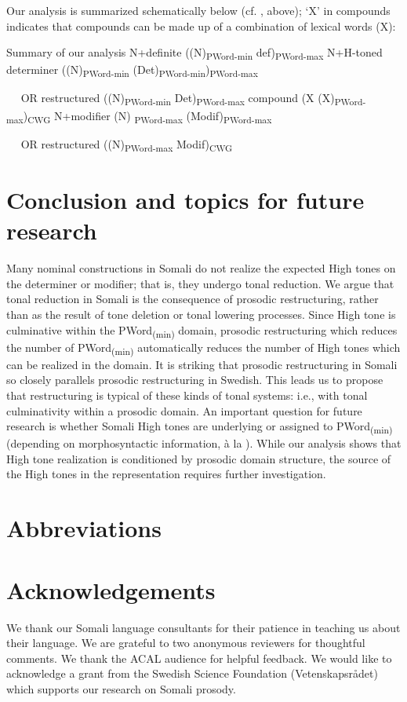 \documentclass[output=paper]{langscibook}
\begin{document}
Our analysis is summarized schematically below (cf. , above); ‘X’ in compounds indicates that compounds can be made up of a combination of lexical words (X):


\ea Summary of our analysis  \label{ex:downing:26}
\ea N+definite        ((N)\textsubscript{PWord-min} def)\textsubscript{PWord-max}
\ex N+H-toned determiner  ((N)\textsubscript{PWord-min} (Det)\textsubscript{PWord-min})\textsubscript{PWord-max} 

  ~~ OR restructured    ((N)\textsubscript{PWord-min} Det)\textsubscript{PWord-max}
\ex compound        (X (X)\textsubscript{PWord-max})\textsubscript{CWG}
\ex N+modifier        (N)\textsubscript{ PWord-max} (Modif)\textsubscript{PWord-max} 

  ~~ OR restructured    ((N)\textsubscript{PWord-max} Modif)\textsubscript{CWG}
\z
\z


\section{Conclusion and topics for future research}

\label{sec:downing:5}
Many nominal constructions in Somali do not realize the expected High tones on the determiner or modifier; that is, they undergo tonal reduction. We argue that tonal reduction in Somali is the consequence of prosodic restructuring, rather than as the result of tone deletion or tonal lowering processes. Since High tone is culminative within the PWord\textsubscript{(min)} domain, prosodic restructuring which reduces the number of PWord\textsubscript{(min)} automatically reduces the number of High tones which can be realized in the domain. It is striking that prosodic restructuring in Somali so closely parallels prosodic restructuring in Swedish. This leads us to propose that restructuring is typical of these kinds of tonal systems: i.e., with tonal culminativity within a prosodic domain. An important question for future research is whether Somali High tones are underlying or assigned to PWord\textsubscript{(min)} (depending on morphosyntactic information, à la \citealt{Hyman1981}). While our analysis shows that High tone realization is conditioned by prosodic domain structure, the source of the High tones in the representation requires further investigation. 

\section*{Abbreviations}

\section*{Acknowledgements}
We thank our Somali language consultants for their patience in teaching us about their language. We are grateful to two anonymous reviewers for thoughtful comments. We thank the ACAL audience for helpful feedback. We would like to acknowledge a grant from the Swedish Science Foundation (Vetenskapsrådet) which supports our research on Somali prosody. 


{\sloppy
\printbibliography[heading=subbibliography,notkeyword=this] 
}
\end{document}
